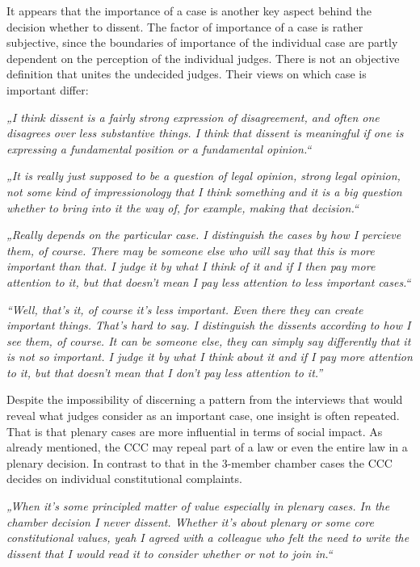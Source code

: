 \documentclass[
  11pt,
]{article}
\begin{document}
It appears that the importance of a case is another key aspect behind the decision whether to dissent. The factor of importance of a case is rather subjective, since the boundaries of importance of the individual case are partly dependent on the perception of the individual judges. There is not an objective definition that unites the undecided judges. Their views on which case is important differ:

\emph{„I think dissent is a fairly strong expression of disagreement, and often one disagrees over less substantive things. I think that dissent is meaningful if one is expressing a fundamental position or a fundamental opinion.``}

\emph{„It is really just supposed to be a question of legal opinion, strong legal opinion, not some kind of impressionology that I think something and it is a big question whether to bring into it the way of, for example, making that decision.``}

\emph{„Really depends on the particular case. I distinguish the cases by how I percieve them, of course. There may be someone else who will say that this is more important than that. I judge it by what I think of it and if I then pay more attention to it, but that doesn't mean I pay less attention to less important cases.``}

\emph{``Well, that's it, of course it's less important. Even there they can create important things. That's hard to say. I distinguish the dissents according to how I see them, of course. It can be someone else, they can simply say differently that it is not so important. I judge it by what I think about it and if I pay more attention to it, but that doesn't mean that I don't pay less attention to it.''}

Despite the impossibility of discerning a pattern from the interviews that would reveal what judges consider as an important case, one insight is often repeated. That is that plenary cases are more influential in terms of social impact. As already mentioned, the CCC may repeal part of a law or even the entire law in a plenary decision. In contrast to that in the 3-member chamber cases the CCC decides on individual constitutional complaints.

\emph{„When it's some principled matter of value especially in plenary cases. In the chamber decision I never dissent. Whether it's about plenary or some core constitutional values, yeah I agreed with a colleague who felt the need to write the dissent that I would read it to consider whether or not to join in.``}
\end{document}
